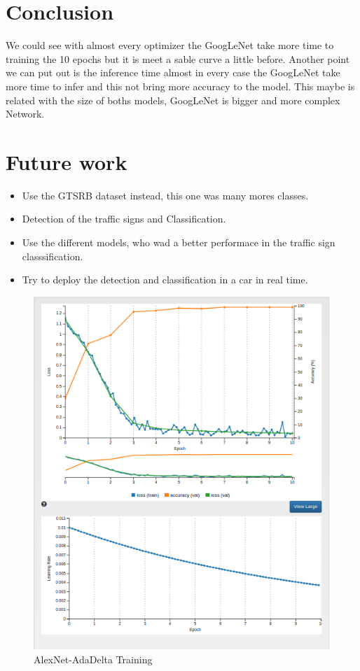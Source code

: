 \documentclass[10pt,journal,compsoc]{IEEEtran}
\begin{document}
\section{Conclusion}

We could see with almost every optimizer the GoogLeNet take more time to training the 10 epochs but it is meet a sable
curve a little before. Another point we can put out is the inference time almost in every case the GoogLeNet take more
time to infer and this not bring more accuracy to the model.
This maybe is related with the size of boths models, GoogLeNet is bigger and more complex Network.

\section{Future work}
\begin{itemize}
  \item Use the GTSRB dataset instead, this one was many mores classes.  
  \item Detection of the traffic signs and Classification.
  \item Use the different models, who wad a better performace in the traffic sign classsification.
  \item Try to deploy the detection and classification in a car in real time.
\end{itemize}


\begin{figure}[thpb]
      \centering
      \includegraphics[width=\linewidth]{alex-10-adadelta-exp99-training.jpg}
      \caption{AlexNet-AdaDelta Training}
      \label{fig:alexnettraining}

\end{figure}
\end{document}
